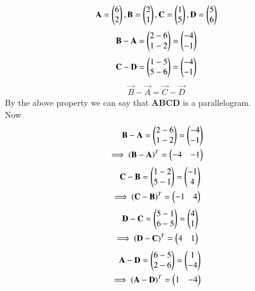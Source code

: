 \documentclass[journal,12pt,onecolumn]{IEEEtran}
\begin{document}
		\begin{align}
			\mathbf{A} = \begin{pmatrix}6\\2\end{pmatrix} ,\mathbf{B}=\begin{pmatrix}2\\1\end{pmatrix} ,\mathbf{C}=\begin{pmatrix}1\\5\end{pmatrix} , \mathbf{D}=\begin{pmatrix}5\\6\end{pmatrix}
		\end{align}
		\begin{align}
		    \mathbf{B}-\mathbf{A}=\begin{pmatrix}2-6\\1-2\end{pmatrix}=\begin{pmatrix}-4\\-1\end{pmatrix}
		\end{align}
        \begin{align}
            \mathbf{C}-\mathbf{D}=\begin{pmatrix}1-5\\5-6\end{pmatrix}=\begin{pmatrix}-4\\-1\end{pmatrix}
        \end{align}
        \begin{align}
            \vec{B}-\vec{A}=\vec{C}-\vec{D}
        \end{align}
        By the above property we can say that \textbf{ABCD} is a parallelogram.\\
        Now \begin{align}
            \mathbf{B-A}=\begin{pmatrix}2-6\\1-2\end{pmatrix}=\begin{pmatrix}-4\\-1\end{pmatrix}\\
            \implies \mathbf{(B-A)}^T=\begin{pmatrix}-4 & -1\end{pmatrix}\\
            \end{align}
            \begin{align}
            \mathbf{C-B}=\begin{pmatrix}1-2\\5-1\end{pmatrix}=\begin{pmatrix}-1\\4\end{pmatrix}\\
            \implies \mathbf{(C-B)}^T=\begin{pmatrix}-1 & 4\end{pmatrix}\\
            \end{align}
            \begin{align}
            \mathbf{D-C}=\begin{pmatrix}5-1\\6-5\end{pmatrix}=\begin{pmatrix}4\\1\end{pmatrix}\\
            \implies \mathbf{(D-C)}^T=\begin{pmatrix}4 & 1\end{pmatrix}\\
            \end{align}
            \begin{align}
            \mathbf{A-D}=\begin{pmatrix}6-5\\2-6\end{pmatrix}=\begin{pmatrix}1\\-4\end{pmatrix}\\
            \implies \mathbf{(A-D)}^T=\begin{pmatrix}1 & -4\end{pmatrix}\\
            \end{align}
\end{document}

